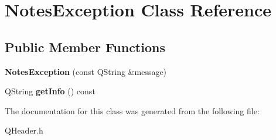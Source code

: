 \hypertarget{classNotesException}{\section{\-Notes\-Exception \-Class \-Reference}
\label{classNotesException}
}
\subsection*{\-Public \-Member \-Functions}
\begin{DoxyCompactItemize}
\item 
\hypertarget{classNotesException_af10aca61d1cb993b62e868f0fe9bf144}{{\bfseries \-Notes\-Exception} (const \-Q\-String \&message)}\label{classNotesException_af10aca61d1cb993b62e868f0fe9bf144}

\item 
\hypertarget{classNotesException_abe69dc0035ff93205ec8aeb1770ab8c5}{\-Q\-String {\bfseries get\-Info} () const }\label{classNotesException_abe69dc0035ff93205ec8aeb1770ab8c5}

\end{DoxyCompactItemize}


\-The documentation for this class was generated from the following file\-:\begin{DoxyCompactItemize}
\item 
\-Q\-Header.\-h\end{DoxyCompactItemize}
